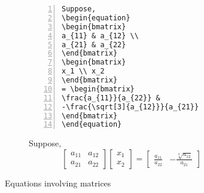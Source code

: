 \documentclass{article}
\begin{document}
\begin{figure}[h]
\centering
\begin{subfigure}{0.4\textwidth}
\begin{Verbatim}[numbers = left]
Suppose,
\begin{equation}
\begin{bmatrix}
a_{11} & a_{12} \\
a_{21} & a_{22}
\end{bmatrix}
\begin{bmatrix}
x_1 \\ x_2
\end{bmatrix}
= \begin{bmatrix}
\frac{a_{11}}{a_{22}} & 
-\frac{\sqrt[3]{a_{12}}}{a_{21}} 
\end{bmatrix}
\end{equation}
\end{Verbatim}
\end{subfigure}
\begin{subfigure}{0.5\textwidth}
Suppose,
\begin{equation}
\begin{bmatrix}
a_{11} & a_{12} \\
a_{21} & a_{22}
\end{bmatrix}
\begin{bmatrix}
x_1 \\ x_2
\end{bmatrix}
= \begin{bmatrix}
\frac{a_{11}}{a_{22}} & 
-\frac{\sqrt[3]{a_{12}}}{a_{21}} 
\end{bmatrix}
\end{equation}
\end{subfigure} 
\caption{Equations involving matrices}
\label{fig:matrixEquation}
\end{figure}
\end{document}
